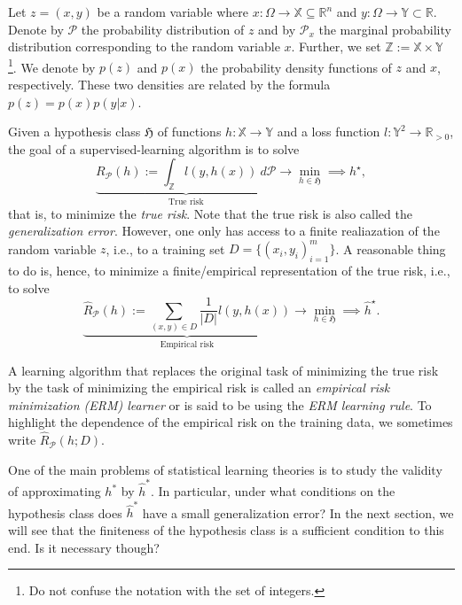 Let $z = (x, y)$ be a random variable where $x: \Omega \to \mathbb{X} \subseteq
\mathbb{R}^n$ and $y: \Omega \to \mathbb{Y} \subset \mathbb{R}$. Denote by
$\mathcal{P}$ the probability distribution of $z$ and by $\mathcal{P}_x$ the
marginal probability distribution corresponding to the random variable $x$.
Further, we set $\mathbb{Z} := \mathbb{X} \times \mathbb{Y}$ \footnote{Do not
confuse the notation with the set of integers.}. We denote by $p(z)$ and $p(x)$
the probability density functions of $z$ and $x$, respectively. These two
densities are related by the formula $p(z) = p(x)p(y|x)$.

Given a hypothesis class $\mathfrak{H}$ of functions $h: \mathbb{X} \to \mathbb{Y}$ and a loss function $l:\mathbb{Y}^2 \to \mathbb{R}_{>0}$, the goal of a supervised-learning
algorithm is to solve 
\begin{equation*}
    \underbrace{R_{\mathcal{P}}(h) := \int_{\mathbb{Z}} l(y, h(x)) \ d \mathcal{P}}_{\text{True risk}} \longrightarrow \min_{h \in \mathfrak{H}} \implies h^\star, 
\end{equation*}
that is, to minimize the \emph{true risk}. Note that the true risk is also called the
\emph{generalization error}. However, one only has access to a finite
realiazation of the random variable $z$, i.e., to a training set $D=\{(x_i,
y_i)_{i=1}^m\}$. A reasonable thing to do is, hence, to minimize a
finite/empirical representation of the true risk, i.e., to solve
\begin{equation*}
    \underbrace{\hat{R}_{\mathcal{P}} (h) := \sum_{(x,y) \in D} \frac{1}{|D|}l(y, h(x)) }_{\text{Empirical risk}} \longrightarrow \min_{h \in \mathfrak{H}} \implies \hat{h}^\star.
\end{equation*}

A learning algorithm that replaces the original task of minimizing the true risk
by the task of minimizing the empirical risk is called an \emph{empirical risk
minimization (ERM) learner} or
is said to be using the \emph{ERM learning rule}. To highlight the dependence of
the empirical risk on the training data, we sometimes write $\hat{R}_{\mathcal{P}}(h;D)$.

One of the main problems of statistical learning theories is to study the
validity of approximating $h^*$ by $\hat{h}^*$. In particular, under what
conditions on the hypothesis class does $\hat{h}^*$ have a small generalization error?
In the next section, we will see that the finiteness of the hypothesis class is
a sufficient condition to this end. Is it necessary though?

